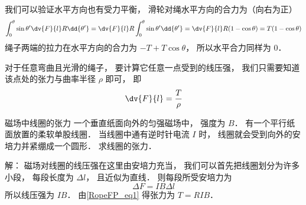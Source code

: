 我们可以验证水平方向也有受力平衡， 滑轮对绳水平方向的合力为（向右为正）
\begin{equation}
\int_0^\theta \sin\theta' \dv{F}{l} R\dd{\theta'}
= \dv{F}{l} R \int_0^\theta \sin\theta' \dd{\theta'}
= \dv{F}{l} R (1 - \cos\theta)
= T(1 - \cos\theta)
\end{equation}
绳子两端的拉力在水平方向的合力为 $-T + T\cos\theta$， 所以水平合力同样为 0．

对于任意弯曲且光滑的绳子， 要计算它任意一点受到的线压强， 我们只需要知道该点处的张力与曲率半径 $\rho$ 即可， 即
\begin{equation}
\dv{F}{l} = \frac{T}{\rho}
\end{equation}

\begin{example}{磁场中线圈的张力}
一个垂直纸面向外的匀强磁场中， 强度为 $B$． 有一个平行纸面放置的柔软单股线圈． 当线圈中通有逆时针电流 $I$ 时， 线圈就会受到向外的安培力并紧绷成一个圆形． 求线圈的张力．

解： 磁场对线圈的线压强在这里由安培力充当， 我们可以首先把线圈划分为许多小段， 每段长度为 $\Delta l$， 且近似为直线． 则每段所受安培力为
\begin{equation}
\Delta F = IB\Delta l
\end{equation}
所以线压强为 $IB$． 由\autoref{RopeFP_eq1} 得张力为 $T = RIB$．
\end{example}
